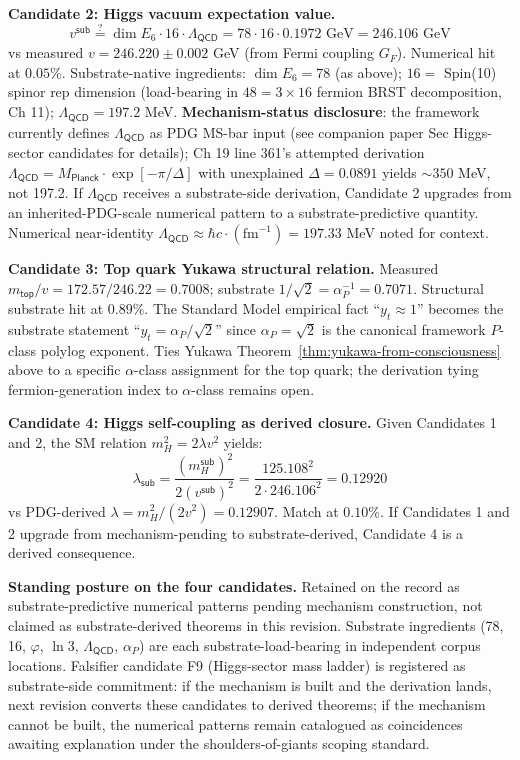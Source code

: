 \begin{level2}
\textbf{Candidate 2: Higgs vacuum expectation value.}
\begin{equation}
v^{\textsf{sub}} \stackrel{?}{=} \dim E_6 \cdot 16 \cdot \Lambda_{\textsf{QCD}} = 78 \cdot 16 \cdot 0.1972 \text{ GeV} = 246.106 \text{ GeV}
\end{equation}
vs measured $v = 246.220 \pm 0.002$ GeV (from Fermi coupling $G_F$). Numerical hit at $0.05\%$. Substrate-native ingredients: $\dim E_6 = 78$ (as above); $16 = $ Spin(10) spinor rep dimension (load-bearing in $48 = 3 \times 16$ fermion BRST decomposition, Ch 11); $\Lambda_{\textsf{QCD}} = 197.2$ MeV. \textbf{Mechanism-status disclosure}: the framework currently defines $\Lambda_{\textsf{QCD}}$ as PDG MS-bar input (see companion paper Sec Higgs-sector candidates for details); Ch 19 line 361's attempted derivation $\Lambda_{\textsf{QCD}} = M_{\textsf{Planck}} \cdot \exp[-\pi/\Delta]$ with unexplained $\Delta = 0.0891$ yields $\sim 350$ MeV, not 197.2. If $\Lambda_{\textsf{QCD}}$ receives a substrate-side derivation, Candidate 2 upgrades from an inherited-PDG-scale numerical pattern to a substrate-predictive quantity. Numerical near-identity $\Lambda_{\textsf{QCD}} \approx \hbar c \cdot (\text{fm}^{-1}) = 197.33$ MeV noted for context.

\textbf{Candidate 3: Top quark Yukawa structural relation.}
Measured $m_{\textsf{top}}/v = 172.57/246.22 = 0.7008$; substrate $1/\sqrt{2} = \alpha_P^{-1} = 0.7071$. Structural substrate hit at $0.89\%$. The Standard Model empirical fact ``$y_t \approx 1$'' becomes the substrate statement ``$y_t = \alpha_P/\sqrt{2}$'' since $\alpha_P = \sqrt{2}$ is the canonical framework $P$-class polylog exponent. Ties Yukawa Theorem~\ref{thm:yukawa-from-consciousness} above to a specific $\alpha$-class assignment for the top quark; the derivation tying fermion-generation index to $\alpha$-class remains open.

\textbf{Candidate 4: Higgs self-coupling as derived closure.}
Given Candidates 1 and 2, the SM relation $m_H^2 = 2\lambda v^2$ yields:
\begin{equation}
\lambda_{\textsf{sub}} = \frac{(m_H^{\textsf{sub}})^2}{2 (v^{\textsf{sub}})^2} = \frac{125.108^2}{2 \cdot 246.106^2} = 0.12920
\end{equation}
vs PDG-derived $\lambda = m_H^2/(2v^2) = 0.12907$. Match at $0.10\%$. If Candidates 1 and 2 upgrade from mechanism-pending to substrate-derived, Candidate 4 is a derived consequence.

\textbf{Standing posture on the four candidates.} Retained on the record as substrate-predictive numerical patterns pending mechanism construction, not claimed as substrate-derived theorems in this revision. Substrate ingredients (78, 16, $\varphi$, $\ln 3$, $\Lambda_{\textsf{QCD}}$, $\alpha_P$) are each substrate-load-bearing in independent corpus locations. Falsifier candidate F9 (Higgs-sector mass ladder) is registered as substrate-side commitment: if the mechanism is built and the derivation lands, next revision converts these candidates to derived theorems; if the mechanism cannot be built, the numerical patterns remain catalogued as coincidences awaiting explanation under the shoulders-of-giants scoping standard.
\end{level2}

